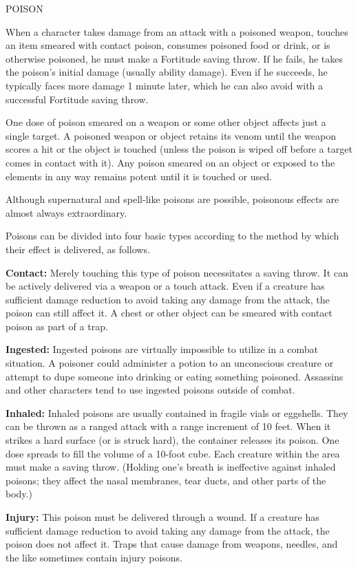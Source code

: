 \documentclass{article}
\begin{document}
\vspace{12pt}
POISON

When a character takes damage from an attack with a poisoned weapon, touches an 
item smeared with contact poison, consumes poisoned food or drink, or is otherwise 
poisoned, he must make a Fortitude saving throw. If he fails, he takes the poison's 
initial damage (usually ability damage). Even if he succeeds, he typically faces 
more damage 1 minute later, which he can also avoid with a successful Fortitude 
saving throw.

One dose of poison smeared on a weapon or some other object affects just a single 
target. A poisoned weapon or object retains its venom until the weapon scores a 
hit or the object is touched (unless the poison is wiped off before a target comes 
in contact with it). Any poison smeared on an object or exposed to the elements 
in any way remains potent until it is touched or used.

Although supernatural and spell-like poisons are possible, poisonous effects are 
almost always extraordinary.

Poisons can be divided into four basic types according to the method by which their 
effect is delivered, as follows.

\textbf{Contact:} Merely touching this type of poison necessitates a saving throw. 
It can be actively delivered via a weapon or a touch attack. Even if a creature 
has sufficient damage reduction to avoid taking any damage from the attack, the 
poison can still affect it. A chest or other object can be smeared with contact 
poison as part of a trap.

\textbf{Ingested:} Ingested poisons are virtually impossible to utilize in a combat 
situation. A poisoner could administer a potion to an unconscious creature or attempt 
to dupe someone into drinking or eating something poisoned. Assassins and other 
characters tend to use ingested poisons outside of combat.

\textbf{Inhaled:} Inhaled poisons are usually contained in fragile vials or eggshells. 
They can be thrown as a ranged attack with a range increment of 10 feet. When it 
strikes a hard surface (or is struck hard), the container releases its poison. 
One dose spreads to fill the volume of a 10-foot cube. Each creature within the 
area must make a saving throw. (Holding one's breath is ineffective against inhaled 
poisons; they affect the nasal membranes, tear ducts, and other parts of the body.)

\textbf{Injury:} This poison must be delivered through a wound. If a creature has 
sufficient damage reduction to avoid taking any damage from the attack, the poison 
does not affect it. Traps that cause damage from weapons, needles, and the like 
sometimes contain injury poisons.
\end{document}
